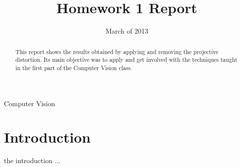 \documentclass{IEEEtran}
\begin{document}
\title{Homework 1 Report}
\date {March of 2013}
\author{
}
\maketitle


\begin{abstract}
This report shows the results obtained by applying and removing 
the projective distortion. Its main objective was to apply and
get involved with the techniques taught in the first part of the
Computer Vision class.
\end{abstract}

\begin{IEEEkeywords}
Computer Vision
\end{IEEEkeywords}

\section{Introduction}
 the introduction ... \cite{hartley2000multiple}

\section{}



\end{document}
